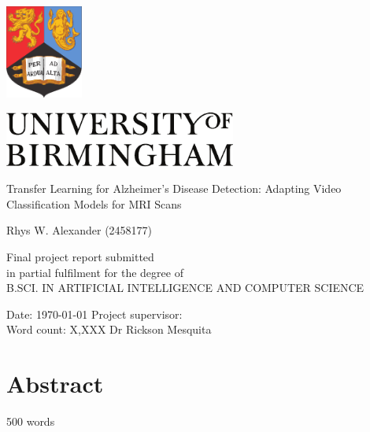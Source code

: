 \documentclass[12pt, a4paper]{article}
\begin{document}
\onehalfspacing


\begin{titlepage}

\begin{center}
\includegraphics[width=1in]{figures/bham_crest}

\vspace{0.3in}

\includegraphics[width=3in]{figures/bham_logo}

\vspace{2in}

{\LARGE Transfer Learning for Alzheimer’s Disease Detection: Adapting Video Classification Models for MRI Scans }

\vspace{0.7in}

{\Large Rhys W. Alexander (2458177)}


\vfill{}
Final project report submitted\\ 
in partial fulfilment for the degree of\\
B.SCI. IN ARTIFICIAL INTELLIGENCE AND COMPUTER SCIENCE
\end{center}

\vspace{0.4in}
Date: \today{}     \hfill{} Project supervisor: \\
Word count: X,XXX   \hfill{} Dr Rickson Mesquita
\end{titlepage}






\tableofcontents

\newpage{}










\section{Abstract}
500 words
\end{document}
